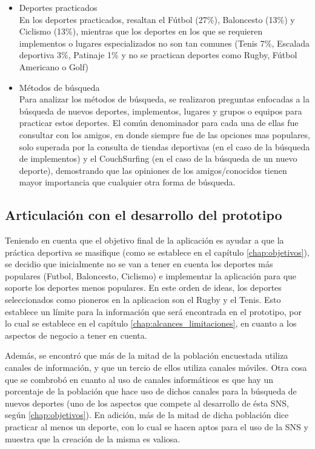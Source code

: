 \begin{itemize}
  \item Deportes practicados \\
  En los deportes practicados, resaltan el Fútbol (27\%), Baloncesto (13\%) y Ciclismo (13\%), mientras que los deportes en los que se requieren implementos o lugares especializados no son tan comunes (Tenis 7\%, Escalada deportiva 3\%, Patinaje 1\% y no se practican deportes como Rugby, Fútbol Americano o Golf)
  \item Métodos de búsqueda \\
  Para analizar los métodos de búsqueda, se realizaron preguntas enfocadas a la búsqueda de nuevos deportes, implementos, lugares y grupos o equipos para practicar estos deportes. El común denominador para cada una de ellas fue consultar con los amigos, en donde siempre fue de las opciones mas populares, solo superada por la consulta de tiendas deportivas (en el caso de la búsqueda de implementos) y el CouchSurfing (en el caso de la búsqueda de un nuevo deporte), demostrando que las opiniones de los amigos/conocidos tienen mayor importancia que cualquier otra forma de búsqueda.
\end{itemize}

\subsection{Articulación con el desarrollo del prototipo}

Teniendo en cuenta que el objetivo final de la aplicación es ayudar a que la práctica deportiva se masifique (como se establece en el capítulo \ref{chap:objetivos}), se decidio que inicialmente no se van a tener en cuenta los deportes más populares (Futbol, Baloncesto, Ciclismo) e implementar la aplicación para que soporte los deportes menos populares. En este orden de ideas, los deportes seleccionados como pioneros en la aplicacion son el Rugby y el Tenis. Esto establece un límite para la información que será encontrada en el prototipo, por lo cual se establece en el capítulo \ref{chap:alcances_limitaciones}, en cuanto a los aspectos de negocio a tener en cuenta. 

Además, se encontró que más de la mitad de la población encuestada utiliza canales de información, y que un tercio de ellos utiliza canales móviles. Otra cosa que se combrobó en cuanto al uso de canales informáticos es que hay un porcentaje de la población que hace uso de dichos canales para la búsqueda de nuevos deportes (uno de los aspectos que compete al desarrollo de ésta SNS, según \ref{chap:objetivos}). En adición, más de la mitad de dicha población dice practicar al menos un deporte, con lo cual se hacen aptos para el uso de la SNS y muestra que la creación de la misma es valiosa.


